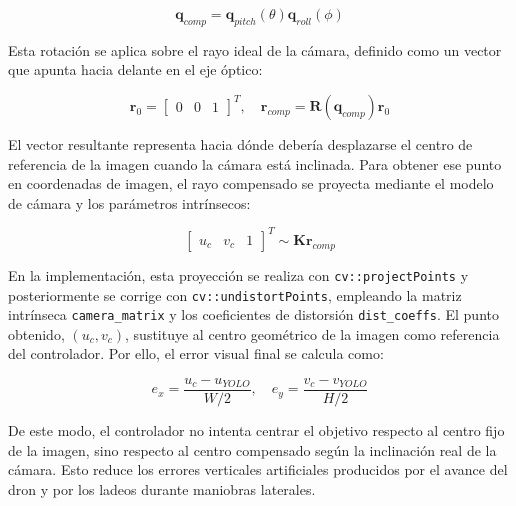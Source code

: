 \begin{equation}
\mathbf{q}_{comp} = \mathbf{q}_{pitch}(\theta) \mathbf{q}_{roll}(\phi)
\end{equation}

\vspace{0.3cm}

Esta rotación se aplica sobre el rayo ideal de la cámara, definido como un vector que apunta hacia delante en el eje óptico:

\begin{equation}
\mathbf{r}_{0} = \left[ \begin{array}{ccc} 0 & 0 & 1 \end{array} \right]^T, \quad
\mathbf{r}_{comp} = \mathbf{R}(\mathbf{q}_{comp})\mathbf{r}_{0}
\end{equation}

\vspace{0.3cm}

El vector resultante representa hacia dónde debería desplazarse el centro de referencia de la imagen cuando la cámara está inclinada. Para obtener ese punto en coordenadas de imagen, el rayo compensado se proyecta mediante el modelo de cámara y los parámetros intrínsecos:

\begin{equation}
\left[ \begin{array}{ccc} u_c & v_c & 1 \end{array} \right]^T \sim
\mathbf{K}\mathbf{r}_{comp}
\end{equation}

\vspace{0.3cm}

En la implementación, esta proyección se realiza con \texttt{cv::projectPoints} y posteriormente se corrige con \texttt{cv::undistortPoints}, empleando la matriz intrínseca \texttt{camera\_matrix} y los coeficientes de distorsión \texttt{dist\_coeffs}. El punto obtenido, $(u_c, v_c)$, sustituye al centro geométrico de la imagen como referencia del controlador. Por ello, el error visual final se calcula como:

\begin{equation}
e_x = \frac{u_c - u_{YOLO}}{W/2}, \quad
e_y = \frac{v_c - v_{YOLO}}{H/2}
\end{equation}

\vspace{0.3cm}

De este modo, el controlador no intenta centrar el objetivo respecto al centro fijo de la imagen, sino respecto al centro compensado según la inclinación real de la cámara. Esto reduce los errores verticales artificiales producidos por el avance del dron y por los ladeos durante maniobras laterales.

